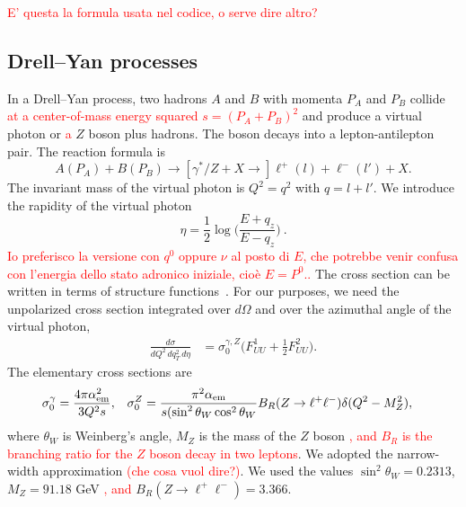 \documentclass[aps,preprintnumbers,showpacs,nofootinbib,superscriptaddress,floatfix]{revtex4}
\begin{document}
\textcolor{red}{ E' questa la formula usata nel codice, o serve dire altro?}

\subsection{Drell--Yan processes}
\label{ss:DY_formalism}

In a Drell--Yan process, two hadrons $A$ and $B$ with momenta $P_A$ and $P_B$ collide \textcolor{red}{at a center-of-mass energy squared $s = (P_A + P_B)^2$} and produce a virtual photon or \textcolor{red}{a} $Z$ boson plus hadrons. 
The boson decays into a
lepton-antilepton pair. The reaction formula is
\begin{equation}
A(P_A)+B(P_B)\to [\gamma^*/Z + X \to] \ell^+(l) + \ell^-(l') + X.
\end{equation} 
The invariant mass of the virtual photon is $Q^2=q^2$ with $q = l + l'$. 
We introduce the rapidity of the virtual photon
\begin{equation}
\eta=\frac{1}{2}\log\bigg(\frac{E+q_z}{E-q_z}\bigg)\  .
\end{equation} 
\textcolor{red}{Io preferisco la versione con $q^0$ oppure $\nu$ al posto di $E$, che potrebbe venir confusa con l'energia dello stato adronico iniziale, cio\`e $E=P^0$..} 
The cross section can be written in terms of structure
functions~\cite{Boer:2006eq,Arnold:2008kf}. For our purposes, we need the unpolarized 
cross section
integrated over $d\Omega$ and over the azimuthal angle of the virtual photon, 
\begin{align}
\frac{d\sigma}{dQ^2\, dq_T^2\,d\eta} &= \sigma_0^{\gamma,Z}
\bigg(F_{UU}^1 + \frac{1}{2} F_{UU}^2\bigg). 
\end{align} 
The elementary cross sections are
\begin{align}
\sigma_0^{\gamma} &= \frac{4\pi \alpha^2_{\rm em}}{3 Q^2 s},
&
\sigma_0^Z &= 
\frac{\pi^2 \alpha_{\rm em}}{s (\sin^2{\theta_W} \cos^2{\theta_W}}
B_R(Z\rightarrow \ell^+\ell^-)
\delta(Q^2 - M_Z^2), 
\end{align} 
where $\theta_W$ is Weinberg's angle, $M_Z$ is the mass of the $Z$ boson \textcolor{red}{, and $B_R$ is the branching ratio for the $Z$ boson decay in two leptons}.
We adopted the narrow-width approximation \textcolor{red}{(che cosa vuol dire?)}. We used the values 
$\sin^2 \theta_W= 0.2313$, $M_Z = 91.18$ GeV \textcolor{red}{, and} 
$B_R(Z\rightarrow \ell^+\ell^-)=3.366$.  
\end{document}
